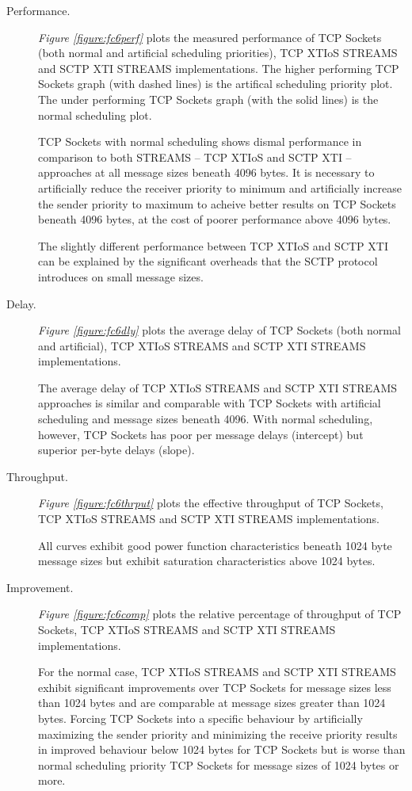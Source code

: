 \documentclass[letterpaper,final,notitlepage,twocolumn,10pt,twoside]{article}
\begin{document}
\begin{description}

\item[Performance.]

\textit{Figure \ref{figure:fc6perf}}
plots the measured performance of TCP Sockets (both normal and artificial scheduling priorities),
TCP XTIoS STREAMS and SCTP XTI STREAMS implementations.
The higher performing TCP Sockets graph (with dashed lines) is the artifical scheduling priority
plot.  The under performing TCP Sockets graph (with the solid lines) is the normal scheduling plot.

TCP Sockets with normal scheduling shows dismal performance in comparison to both STREAMS -- TCP
XTIoS and SCTP XTI -- approaches at all message sizes beneath 4096 bytes.  It is necessary to
artificially reduce the receiver priority to minimum and artificially increase the sender priority
to maximum to acheive better results on TCP Sockets beneath 4096 bytes, at the cost of poorer
performance above 4096 bytes.

The slightly different performance between TCP XTIoS and SCTP XTI can be explained by the
significant overheads that the SCTP protocol introduces on small message sizes.

\item[Delay.]

\textit{Figure \ref{figure:fc6dly}}
plots the average delay of TCP Sockets (both normal and artificial), TCP XTIoS STREAMS and SCTP XTI
STREAMS implementations.

The average delay of TCP XTIoS STREAMS and SCTP XTI STREAMS approaches is similar and comparable
with TCP Sockets with artificial scheduling and message sizes beneath 4096.  With normal scheduling,
however, TCP Sockets has poor per message delays (intercept) but superior per-byte delays (slope).

\item[Throughput.]

\textit{Figure \ref{figure:fc6thrput}}
plots the effective throughput of TCP Sockets, TCP XTIoS STREAMS and SCTP XTI STREAMS
implementations.

All curves exhibit good power function characteristics beneath 1024 byte  message sizes but exhibit
saturation characteristics above 1024 bytes.

\item[Improvement.]

\textit{Figure \ref{figure:fc6comp}}
plots the relative percentage of throughput of TCP Sockets, TCP XTIoS STREAMS and SCTP XTI STREAMS
implementations.

For the normal case, TCP XTIoS STREAMS and SCTP XTI STREAMS exhibit significant improvements over
TCP Sockets for message sizes less than 1024 bytes and are comparable  at message sizes greater than
1024 bytes.  Forcing TCP Sockets into a specific behaviour by artificially maximizing the sender
priority and minimizing the receive priority results in improved behaviour below 1024 bytes for TCP
Sockets but is worse than normal scheduling priority TCP Sockets for message sizes of 1024 bytes or
more.

\end{description}
\end{document}
